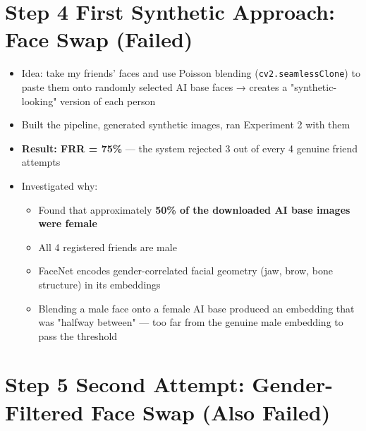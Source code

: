 \documentclass[11pt,a4paper]{article}
\begin{document}
\section*{Step 4 \quad First Synthetic Approach: Face Swap (Failed)}

\begin{itemize}
    \item Idea: take my friends' faces and use Poisson blending (\texttt{cv2.seamlessClone}) to paste them onto randomly selected AI base faces → creates a "synthetic-looking" version of each person
    \item Built the pipeline, generated synthetic images, ran Experiment 2 with them
    \item \textbf{Result: FRR = 75\%} — the system rejected 3 out of every 4 genuine friend attempts
    \item Investigated why:
    \begin{itemize}
        \item Found that approximately \textbf{50\% of the downloaded AI base images were female}
        \item All 4 registered friends are male
        \item FaceNet encodes gender-correlated facial geometry (jaw, brow, bone structure) in its embeddings
        \item Blending a male face onto a female AI base produced an embedding that was "halfway between" — too far from the genuine male embedding to pass the threshold
    \end{itemize}
\end{itemize}

\section*{Step 5 \quad Second Attempt: Gender-Filtered Face Swap (Also Failed)}
\end{document}
